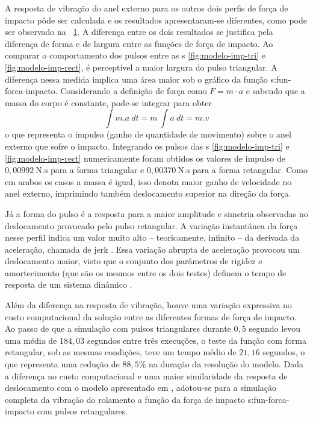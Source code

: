 \documentclass[12pt,oneside,english,brazil,lmodern,siglas,simbolos,cite=num]{ucsmonograph}
\begin{document}
	A resposta de vibração do anel externo para os outros dois perfis de força de impacto pôde ser calculada e os resultados apresentaram-se diferentes, como pode ser observado na \figurename\ \ref{fig:modelo-comp-pulsos}.
	A diferença entre os dois resultados se justifica pela diferença de forma e de largura entre as funções de força de impacto.
	Ao comparar o comportamento dos pulsos entre as {\figurename s} \ref{fig:modelo-imp-tri} e \ref{fig:modelo-imp-rect}, é perceptível a maior largura do pulso triangular.
	A diferença nessa medida implica uma área maior sob o gráfico da função \gls{s:fun-forca-impacto}.
	Considerando a definição de força como $F = m\cdot a$ e sabendo que a massa do corpo é constante, pode-se integrar para obter \[ \int m.a\ dt = m\,\int a\ dt = m.v \]
	o que representa o impulso (ganho de quantidade de movimento) sobre o anel externo que sofre o impacto.
	Integrando os pulsos das {\figurename s} \ref{fig:modelo-imp-tri} e \ref{fig:modelo-imp-rect} numericamente foram obtidos os valores de impulso de $0,00992\ \text{N.s}$ para a forma triangular e $0,00370\ \text{N.s}$ para a forma retangular.
	Como em ambos os casos a massa é igual, isso denota maior ganho de velocidade no anel externo, imprimindo também deslocamento superior na direção da força.
	
	\begin{figure}[h]
		\label{fig:modelo-comp-pulsos}
	\end{figure}

	Já a forma do pulso é a resposta para a maior amplitude e simetria observadas no deslocamento provocado pelo pulso retangular.
	A variação instantânea da força nesse perfil indica um valor muito alto -- teoricamente, infinito -- da derivada da aceleração, chamada de \foreignlanguage{english}{jerk} \cite{norton:2010}.
	Essa variação abrupta de aceleração provocou um deslocamento maior, visto que o conjunto dos parâmetros de rigidez e amortecimento (que são os mesmos entre os dois testes) definem o tempo de resposta de um sistema dinâmico \cite{lutz:2005}.
	
	Além da diferença na resposta de vibração, houve uma variação expressiva no custo computacional da solução entre as diferentes formas de força de impacto.
	Ao passo de que a simulação com pulsos triangulares durante $0,5$ segundo levou uma média de $184,03$ segundos entre três execuções, o teste da função com forma retangular, sob as mesmas condições, teve um tempo médio de $21,16$ segundos, o que representa uma redução de $88,5\%$ na duração da resolução do modelo.
	Dada a diferença no custo computacional e uma maior similaridade da resposta de deslocamento com o modelo apresentado em \cite{sassi:2007}, adotou-se para a simulação completa da vibração do rolamento a função da força de impacto \gls{s:fun-forca-impacto} com pulsos retangulares.
\end{document}
